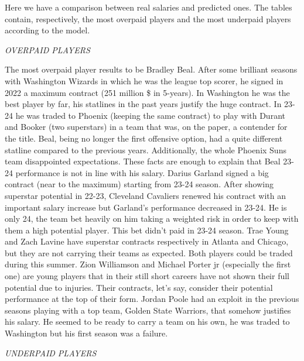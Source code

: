 \documentclass[
]{article}
\begin{document}
Here we have a comparison between real salaries and predicted ones. The
tables contain, respectively, the most overpaid players and the most
underpaid players according to the model.

\emph{OVERPAID PLAYERS}

The most overpaid player results to be Bradley Beal. After some
brilliant seasons with Washington Wizards in which he was the league top
scorer, he signed in 2022 a maximum contract (251 million \$ in
5-years). In Washington he was the best player by far, his statlines in
the past years justify the huge contract. In 23-24 he was traded to
Phoenix (keeping the same contract) to play with Durant and Booker (two
superstars) in a team that was, on the paper, a contender for the title.
Beal, being no longer the first offensive option, had a quite different
statline compared to the previous years. Additionally, the whole Phoenix
Suns team disappointed expectations. These facts are enough to explain
that Beal 23-24 performance is not in line with his salary. Darius
Garland signed a big contract (near to the maximum) starting from 23-24
season. After showing superstar potential in 22-23, Cleveland Cavaliers
renewed his contract with an important salary increase but Garland's
performance decreased in 23-24. He is only 24, the team bet heavily on
him taking a weighted risk in order to keep with them a high potential
player. This bet didn't paid in 23-24 season. Trae Young and Zach Lavine
have superstar contracts respectively in Atlanta and Chicago, but they
are not carrying their teams as expected. Both players could be traded
during this summer. Zion Williamson and Michael Porter jr (especially
the first one) are young players that in their still short careers have
not shown their full potential due to injuries. Their contracts, let's
say, consider their potential performance at the top of their form.
Jordan Poole had an exploit in the previous seasons playing with a top
team, Golden State Warriors, that somehow justifies his salary. He
seemed to be ready to carry a team on his own, he was traded to
Washington but his first season was a failure.

\emph{UNDERPAID PLAYERS}
\end{document}
